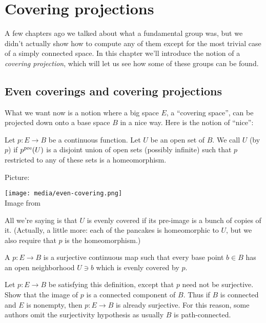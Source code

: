 \chapter{Covering projections}
\label{ch:covering_projections}
A few chapters ago we talked about what a fundamental group was,
but we didn't actually show how to compute any of them
except for the most trivial case of a simply connected space.
In this chapter we'll introduce the notion of a \emph{covering projection},
which will let us see how some of these groups can be found.

\section{Even coverings and covering projections}
What we want now is a notion where a big space $E$, a ``covering space'',
can be projected down onto a base space $B$ in a nice way.
Here is the notion of ``nice'':
\begin{definition}
	Let $p \colon E \to B$ be a continuous function.
	Let $U$ be an open set of $B$.
	We call $U$  (by $p$) if $p^{\text{pre}}(U)$ is a disjoint union of open sets (possibly infinite) such that $p$ restricted to any of these sets is a homeomorphism.
\end{definition}
Picture:
\begin{center}
	\texttt{[image: media/even-covering.png]}
	\\ \scriptsize Image from \cite{img:even_covering}
\end{center}
All we're saying is that $U$ is evenly covered if its pre-image
is a bunch of copies of it. (Actually, a little more: each of the pancakes is homeomorphic to $U$, but we also require that $p$ is the homeomorphism.)

\begin{definition}
	A  $p \colon E \to B$
	is a surjective continuous map such that every base point $b \in B$
	has an open neighborhood $U \ni b$ which is evenly covered by $p$.
\end{definition}
\begin{exercise}
	Let $p \colon E \to B$ be satisfying this definition,
	except that $p$ need not be surjective.
	Show that the image of $p$ is a connected component of $B$.
	Thus if $B$ is connected and $E$ is nonempty,
	then $p \colon E \to B$ is already surjective.
	For this reason, some authors omit the surjectivity hypothesis
	as usually $B$ is path-connected.
\end{exercise}

